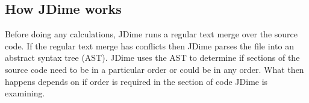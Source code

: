 \subsection{How JDime works}

Before doing any calculations, JDime runs a regular text merge over the source code.  
If the regular text merge has conflicts then JDime parses the file into an abstract syntax tree (AST).  JDime uses the AST to determine if sections of the source code need to be in a particular order or could be in any order.
What then happens depends on if order is required in the section of code JDime is examining.


